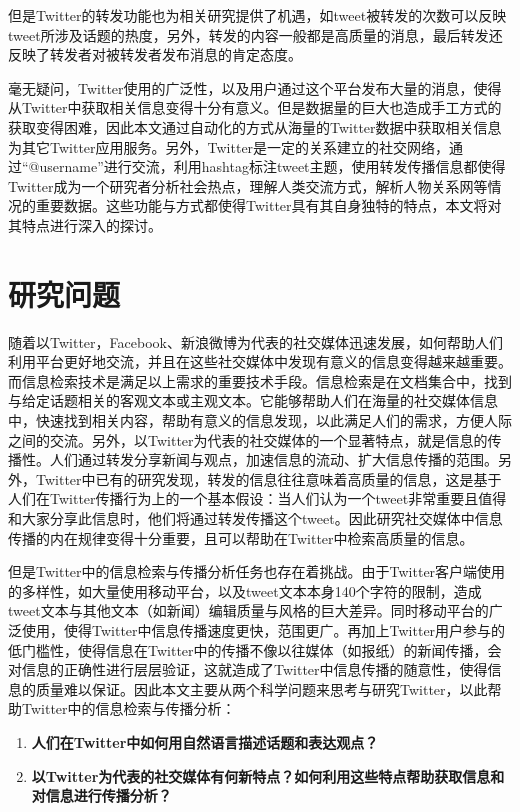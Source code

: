 但是Twitter的转发功能也为相关研究提供了机遇，如tweet被转发的次数可以反映tweet所涉及话题的热度，另外，转发的内容一般都是高质量的消息，最后转发还反映了转发者对被转发者发布消息的肯定态度。

毫无疑问，Twitter使用的广泛性，以及用户通过这个平台发布大量的消息，使得从Twitter中获取相关信息变得十分有意义。但是数据量的巨大也造成手工方式的获取变得困难，因此本文通过自动化的方式从海量的Twitter数据中获取相关信息为其它Twitter应用服务。另外，Twitter是一定的关系建立的社交网络，通过“@username”进行交流，利用hashtag标注tweet主题，使用转发传播信息都使得Twitter成为一个研究者分析社会热点，理解人类交流方式，解析人物关系网等情况的重要数据。这些功能与方式都使得Twitter具有其自身独特的特点，本文将对其特点进行深入的探讨。

\section{研究问题}
\label{point}
随着以Twitter，Facebook、新浪微博为代表的社交媒体迅速发展，如何帮助人们利用平台更好地交流，并且在这些社交媒体中发现有意义的信息变得越来越重要。而信息检索技术是满足以上需求的重要技术手段。信息检索是在文档集合中，找到与给定话题相关的客观文本或主观文本。它能够帮助人们在海量的社交媒体信息中，快速找到相关内容，帮助有意义的信息发现，以此满足人们的需求，方便人际之间的交流。另外，以Twitter为代表的社交媒体的一个显著特点，就是信息的传播性。人们通过转发分享新闻与观点，加速信息的流动、扩大信息传播的范围。另外，Twitter中已有的研究发现，转发的信息往往意味着高质量的信息，这是基于人们在Twitter传播行为上的一个基本假设：当人们认为一个tweet非常重要且值得和大家分享此信息时，他们将通过转发传播这个tweet。因此研究社交媒体中信息传播的内在规律变得十分重要，且可以帮助在Twitter中检索高质量的信息。

但是Twitter中的信息检索与传播分析任务也存在着挑战。由于Twitter客户端使用的多样性，如大量使用移动平台，以及tweet文本本身140个字符的限制，造成tweet文本与其他文本（如新闻）编辑质量与风格的巨大差异。同时移动平台的广泛使用，使得Twitter中信息传播速度更快，范围更广。再加上Twitter用户参与的低门槛性，使得信息在Twitter中的传播不像以往媒体（如报纸）的新闻传播，会对信息的正确性进行层层验证，这就造成了Twitter中信息传播的随意性，使得信息的质量难以保证。因此本文主要从两个科学问题来思考与研究Twitter，以此帮助Twitter中的信息检索与传播分析：
    \begin{enumerate}
    \item \textbf{人们在Twitter中如何用自然语言描述话题和表达观点？}
    \item \textbf{以Twitter为代表的社交媒体有何新特点？如何利用这些特点帮助获取信息和对信息进行传播分析？}
    \end{enumerate}  

